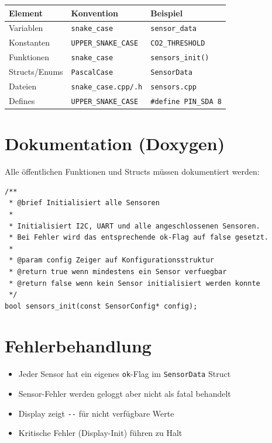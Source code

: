 \documentclass[a4paper,11pt]{article}
\begin{document}
\begin{longtable}{p{3.5cm} p{4.5cm} p{5cm}}
\toprule
\rowcolor{tableheader}
\textbf{Element} & \textbf{Konvention} & \textbf{Beispiel} \\
\midrule
\endhead
Variablen        & \texttt{snake\_case}       & \texttt{sensor\_data} \\
Konstanten       & \texttt{UPPER\_SNAKE\_CASE} & \texttt{CO2\_THRESHOLD} \\
Funktionen       & \texttt{snake\_case}       & \texttt{sensors\_init()} \\
Structs/Enums    & \texttt{PascalCase}        & \texttt{SensorData} \\
Dateien          & \texttt{snake\_case.cpp/.h} & \texttt{sensors.cpp} \\
Defines          & \texttt{UPPER\_SNAKE\_CASE} & \texttt{\#define PIN\_SDA 8} \\
\bottomrule
\end{longtable}

\section{Dokumentation (Doxygen)}

Alle öffentlichen Funktionen und Structs müssen dokumentiert werden:

\begin{lstlisting}
/**
 * @brief Initialisiert alle Sensoren
 *
 * Initialisiert I2C, UART und alle angeschlossenen Sensoren.
 * Bei Fehler wird das entsprechende ok-Flag auf false gesetzt.
 *
 * @param config Zeiger auf Konfigurationsstruktur
 * @return true wenn mindestens ein Sensor verfuegbar
 * @return false wenn kein Sensor initialisiert werden konnte
 */
bool sensors_init(const SensorConfig* config);
\end{lstlisting}

\section{Fehlerbehandlung}

\begin{itemize}[leftmargin=2em]
    \item Jeder Sensor hat ein eigenes \texttt{ok}-Flag im \texttt{SensorData} Struct
    \item Sensor-Fehler werden geloggt aber nicht als fatal behandelt
    \item Display zeigt \texttt{-{}-} für nicht verfügbare Werte
    \item Kritische Fehler (Display-Init) führen zu Halt
\end{itemize}
\end{document}
